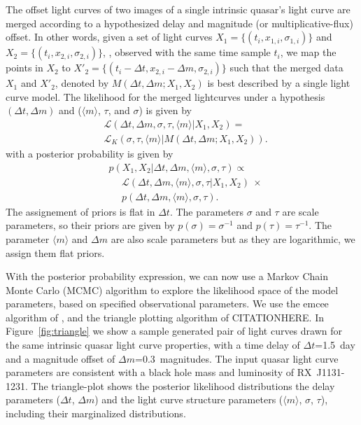 \documentclass{emulateapj}
\begin{document}
The offset light curves of two images of a single intrinsic quasar's 
light curve are merged according to a hypothesized delay and magnitude
(or multiplicative-flux) offset. In other words, given a set of light curves
$X_1 = \{(t_{i},x_{1,i},\sigma_{1,i})\}$ and $X_2 = \{(t_{i},x_{2,i},\sigma_{2,i})\}$, , observed with the same time sample $t_i$,  
we map the points in $X_2$ to $X'_2 = \{(t_{i}-\Delta t,x_{2,i}-\Delta m,\sigma_{2,i})\}$  
such that the merged data $X_1$ and $X'_2$, denoted by $M(\Delta t, \Delta m ; X_1, X_2)$ is best described 
by a single light curve model. The likelihood for the merged lightcurves under a 
hypothesis $(\Delta t, \Delta m)$ and ($\langle m\rangle$, $\tau$, and $\sigma$) is given by
\begin{align}
& \mathcal L (\Delta t, \Delta m, \sigma, \tau, \langle m \rangle | X_1, X_2)  = \nonumber \\
& \mathcal{L}_{K} \left( \sigma, \tau, \langle m \rangle  | M(\Delta
  t,\Delta m ; X_1, X_2) \right). 
\end{align}
with a posterior probability is given by
\begin{align}
& p(X_1, X_2 | \Delta t, \Delta m, \langle m \rangle, \sigma,\tau) \propto \nonumber \\
&  \ \ \ \ \ \ \mathcal{L}(\Delta t, \Delta m, \langle m \rangle,
\sigma,\tau | X_1, X_2)\ \times\nonumber\\
&  \ \ \ \ \ \   p(\Delta t, \Delta m, \langle m \rangle,
\sigma,\tau). 
\end{align}
The assignement of priors is flat in $\Delta t$. The parameters
$\sigma$ and $\tau$ are scale parameters, so their priors are given by
$p(\sigma)=\sigma^{-1}$ and $p(\tau)=\tau^{-1}$. The parameter
$\langle m \rangle$ and $\Delta m$ are also scale parameters but as
they are logarithmic, we assign them flat priors.  

With the posterior probability expression, we can now use a Markov
Chain Monte Carlo (MCMC) algorithm to explore the likelihood space of
the model parameters, based on specified observational parameters. We
use the emcee algorithm of \citet{Foreman-Mackey2013a}, and the
triangle plotting algorithm of CITATIONHERE. In
Figure~\ref{fig:triangle} we show a sample generated pair of light
curves drawn for the same intrinsic quasar light curve properties,
with a time delay of $\Delta t$=1.5~day and a magnitude offset of
$\Delta m$=0.3~magnitudes. The input quasar light curve parameters are 
consistent with a black hole mass and luminosity of RX~J1131-1231.
The triangle-plot shows the posterior likelihood distributions the delay
parameters ($\Delta t$, $\Delta m$) and the light curve structure parameters 
($\langle m\rangle$, $\sigma$, $\tau$), including their
marginalized distributions. 
\end{document}
